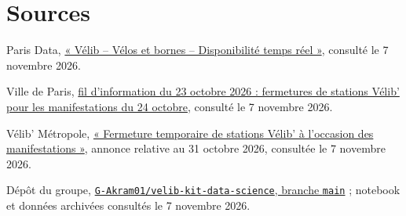 \documentclass[11pt,a4paper]{article}
\begin{document}
\section*{Sources}
\begin{enumerate}[leftmargin=1.8em,label={[\arabic*]},itemsep=0.25em]
\item Paris Data, \href{https://opendata.paris.fr/explore/dataset/velib-disponibilite-en-temps-reel/information/}{« Vélib -- Vélos et bornes -- Disponibilité temps réel »}, consulté le 7 novembre 2026.
\item Ville de Paris, \href{https://www.paris.fr/?photo=26-12}{fil d'information du 23 octobre 2026 : fermetures de stations Vélib' pour les manifestations du 24 octobre}, consulté le 7 novembre 2026.
\item Vélib' Métropole, \href{https://blog.velib-metropole.fr/fermeture-temporaire-de-stations-velib-a-loccasion-des-manifestations-2/}{« Fermeture temporaire de stations Vélib' à l'occasion des manifestations »}, annonce relative au 31 octobre 2026, consultée le 7 novembre 2026.
\item Dépôt du groupe, \href{https://github.com/G-Akram01/velib-kit-data-science}{\texttt{G-Akram01/velib-kit-data-science}, branche \texttt{main}} ; notebook et données archivées consultés le 7 novembre 2026.
\end{enumerate}
\end{document}
